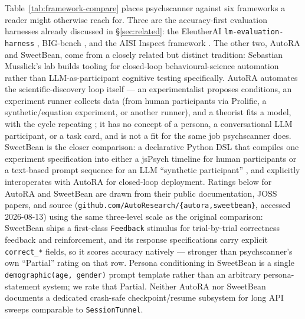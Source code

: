 \documentclass[11pt]{article}
\begin{document}
Table~\ref{tab:framework-compare} places psychscanner against six
frameworks a reader might otherwise reach for. Three are the accuracy-first
evaluation harnesses already discussed in \S\ref{sec:related}: the
EleutherAI \texttt{lm-evaluation-harness} \citep{sutawika2025evalharness},
BIG-bench \citep{srivastava2023bigbench}, and the AISI Inspect framework
\citep{aisi2024inspect}. The other two, AutoRA and SweetBean, come from a
closely related but distinct tradition: Sebastian Musslick's lab builds
tooling for closed-loop behavioural-science automation rather than
LLM-as-participant cognitive testing specifically. AutoRA automates the
scientific-discovery loop itself --- an experimentalist proposes conditions,
an experiment runner collects data (from human participants via Prolific,
a synthetic/equation experiment, or another runner), and a theorist fits a
model, with the cycle repeating \citep{musslick2024autora}; it has no
concept of a persona, a conversational LLM participant, or a task card, and
is not a fit for the same job psychscanner does. SweetBean is the closer
comparison: a declarative Python DSL that compiles one experiment
specification into either a jsPsych timeline for human participants or a
text-based prompt sequence for an LLM ``synthetic participant''
\citep{strittmatter2025sweetbean}, and explicitly interoperates with
AutoRA for closed-loop deployment. Ratings below for AutoRA and SweetBean
are drawn from their public documentation, JOSS papers, and source
(\texttt{github.com/AutoResearch/\{autora,sweetbean\}}, accessed
2026-08-13) using the same three-level scale as the original comparison:
SweetBean ships a first-class \texttt{Feedback} stimulus for trial-by-trial
correctness feedback and reinforcement, and its response specifications
carry explicit \texttt{correct\_*} fields, so it scores accuracy natively
--- stronger than psychscanner's own ``Partial'' rating on that row.
Persona conditioning in SweetBean is a single \texttt{demographic(age,
gender)} prompt template rather than an arbitrary persona-statement system;
we rate that Partial. Neither AutoRA nor SweetBean documents a dedicated
crash-safe checkpoint/resume subsystem for long API sweeps comparable to
\texttt{SessionTunnel}.
\end{document}
